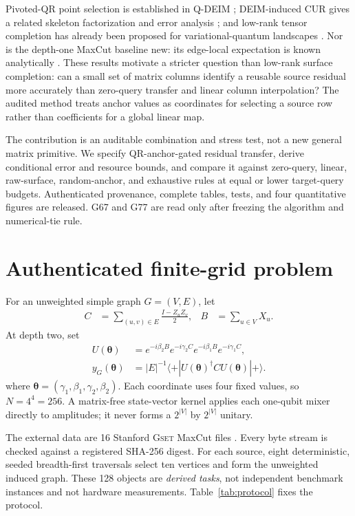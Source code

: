 \documentclass[10pt,letterpaper,twoside]{article}
\newcommand{\dataset}{\textsc{Gset}}
\begin{document}
Pivoted-QR point selection is established in
Q-DEIM \cite{drmac2016qdeim}; DEIM-induced CUR gives a related skeleton
factorization and error analysis \cite{sorensen2016deimcur}; and low-rank
tensor completion has already been proposed for variational-quantum
landscapes \cite{hao2024landscape}.  Nor is the depth-one MaxCut baseline new:
its edge-local expectation is known analytically \cite{wang2018fermionic}.
These results motivate a stricter question than low-rank surface completion:
can a small set of matrix columns identify a reusable source residual more
accurately than zero-query transfer and linear column interpolation?  The
audited method treats anchor values as coordinates for selecting a source row
rather than coefficients for a global linear map.

The contribution is an auditable combination and stress test, not a new
general matrix primitive.  We specify QR-anchor-gated residual transfer,
derive conditional error and resource bounds, and compare it against
zero-query, linear, raw-surface, random-anchor, and exhaustive rules at equal
or lower target-query budgets.  Authenticated provenance, complete tables,
tests, and four quantitative figures are released.  G67 and G77 are read only
after freezing the algorithm and numerical-tie rule.

\section{Authenticated finite-grid problem}

For an unweighted simple graph $G=(V,E)$, let
\begin{align}
 C&=\sum_{(u,v)\in E}\frac{I-Z_uZ_v}{2}, &
 B&=\sum_{u\in V}X_u .
\end{align}
At depth two, set
\begin{align}
U(\bm\theta)&=e^{-i\beta_2B}e^{-i\gamma_2C}
e^{-i\beta_1B}e^{-i\gamma_1C},\\
y_G(\bm\theta)&=|E|^{-1}
\langle+|U(\bm\theta)^\dagger C U(\bm\theta)|+\rangle.
\label{eq:p2}
\end{align}
where $\bm\theta=(\gamma_1,\beta_1,\gamma_2,\beta_2)$.  Each coordinate uses
four fixed values, so $N=4^4=256$.  A matrix-free state-vector kernel applies
each one-qubit mixer directly to amplitudes; it never forms a $2^{|V|}$ by
$2^{|V|}$ unitary.

The external data are 16 Stanford \dataset{} MaxCut files \cite{ye2003gset}.
Every byte stream is checked against a registered SHA-256 digest.  For each
source, eight deterministic, seeded breadth-first traversals select ten
vertices and form the unweighted induced graph.  These 128 objects are
\emph{derived tasks}, not independent benchmark instances and not hardware
measurements.  Table~\ref{tab:protocol} fixes the protocol.
\end{document}
